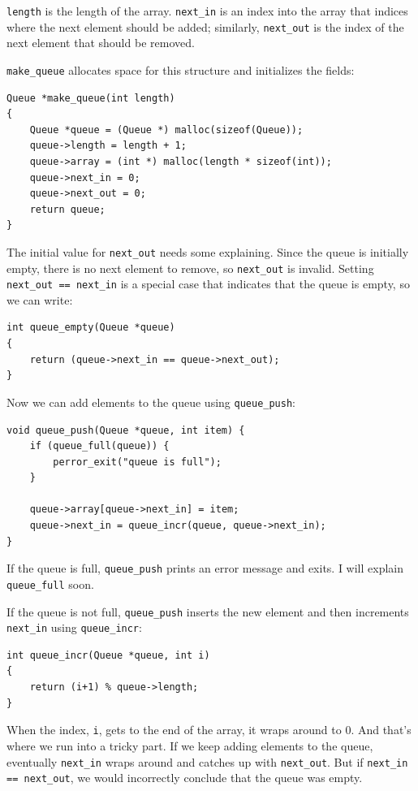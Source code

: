 \documentclass[12pt]{book}
\begin{document}
{{\tt length} is the length of the array.  \verb"next_in" is an
index into the array that indices where the next element should be
added; similarly, \verb"next_out" is the index of the next element
that should be removed.

\verb"make_queue" allocates space for this structure and initializes
the fields:

\begin{verbatim}
Queue *make_queue(int length)
{
    Queue *queue = (Queue *) malloc(sizeof(Queue));
    queue->length = length + 1;
    queue->array = (int *) malloc(length * sizeof(int));
    queue->next_in = 0;
    queue->next_out = 0;
    return queue;
}
\end{verbatim}

The initial value for \verb"next_out" needs some explaining.
Since the queue is initially empty, there is no next element to
remove, so \verb"next_out" is invalid.  Setting
\verb"next_out == next_in" is a special case that indicates
that the queue is empty, so we can write:

\begin{verbatim}
int queue_empty(Queue *queue)
{
    return (queue->next_in == queue->next_out);
}
\end{verbatim}

Now we can add elements to the queue using \verb"queue_push":

\begin{verbatim}
void queue_push(Queue *queue, int item) {
    if (queue_full(queue)) {
        perror_exit("queue is full");
    }
  
    queue->array[queue->next_in] = item;
    queue->next_in = queue_incr(queue, queue->next_in);
}
\end{verbatim}

If the queue is full, \verb"queue_push" prints an error message
and exits.  I will explain \verb"queue_full" soon.

If the queue is not full, \verb"queue_push" inserts the new
element and then increments \verb"next_in" using \verb"queue_incr":

\begin{verbatim}
int queue_incr(Queue *queue, int i)
{
    return (i+1) % queue->length;
}
\end{verbatim}

When the index, {\tt i}, gets to the end of the array, it wraps around
to 0.  And that's where we run into a tricky part.  If we keep adding
elements to the queue, eventually \verb"next_in" wraps around and catches
up with \verb"next_out".  But if \verb"next_in == next_out", we would
incorrectly conclude that the queue was empty.

}
\end{document}
